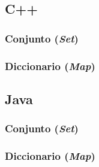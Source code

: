 \subsection{C++}

\subsubsection{Conjunto (\emph{Set})}


\subsubsection{Diccionario (\emph{Map})}


\subsection{Java}

\subsubsection{Conjunto (\emph{Set})}


\subsubsection{Diccionario (\emph{Map})}
